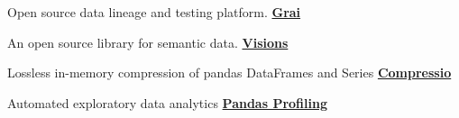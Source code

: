 \begin{cventries}
    \cventry
    {Open source data lineage and testing platform.}
    {\href{https://github.com/grai-io/grai-core}{\textbf{Grai}}}
    {}
    {}
    {}

  \cventry
    {An open source library for semantic data.}
    {\href{https://github.com/dylan-profiler/visions}{\textbf{Visions}}}
    {}
    {}
    {}

  \cventry
    {Lossless in-memory compression of pandas DataFrames and Series}
    {\href{https://github.com/dylan-profiler/compressio}{\textbf{Compressio}}}
    {}
    {}
    {}

  \cventry
    {Automated exploratory data analytics}
    {\href{https://github.com/pandas-profiling/pandas-profiling}{\textbf{Pandas Profiling}}}
    {}
    {}
    {}

\end{cventries}

